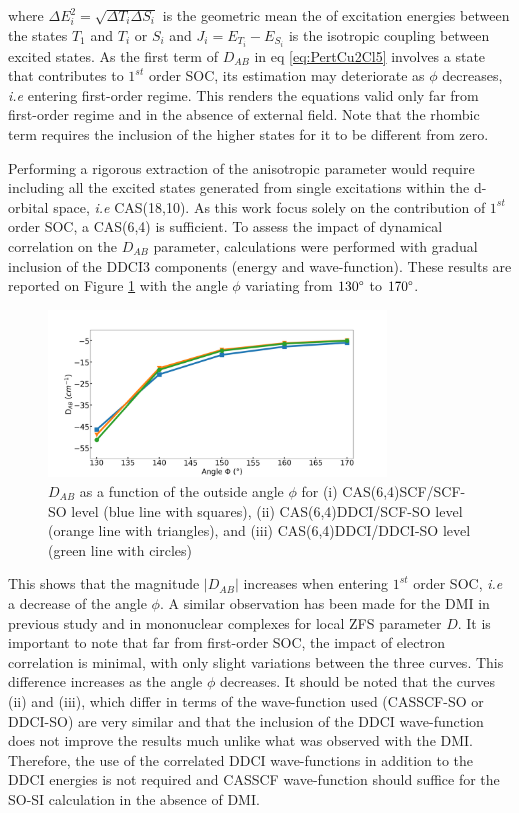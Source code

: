 \documentclass[10pt]{report}
\numberwithin{equation}{section}
\begin{document}
where $\Delta E^2_i=\sqrt{\Delta T_i \Delta S_i}$ is the geometric mean the of excitation energies between the states $T_1$ and $T_i$ or $S_i$ and $J_i=E_{T_i}-E_{S_i}$ is the isotropic coupling between excited states.
As the first term of $D_{AB}$ in eq \ref{eq:PertCu2Cl5} involves a state that contributes to $1^{st}$ order SOC, its estimation may deteriorate as $\phi$ decreases, \textit{i.e} entering first-order regime.
This renders the equations valid only far from first-order regime and in the absence of external field. Note that the rhombic term requires the inclusion of the higher states for it to be different from zero.

Performing a rigorous extraction of the anisotropic parameter would require including all the excited states generated from single excitations within the d-orbital space, \textit{i.e} CAS(18,10).
As this work focus solely on the contribution of $1^{st}$ order SOC, a CAS(6,4) is sufficient. 
To assess the impact of dynamical correlation on the $D_{AB}$ parameter, calculations were performed with gradual inclusion of the DDCI3 components (energy and wave-function).
These results are reported on Figure \ref{DABangle} with the angle $\phi$ variating from $130\degree$ to $170\degree$.

\begin{figure}[!ht]
    \centering
    \includegraphics[width=0.8\textwidth]{Images/D_AB_Angle2.png}
    \caption{$D_{AB}$ as a function of the outside angle $\phi$ for (i) CAS(6,4)SCF/SCF-SO level (blue line with squares), (ii) CAS(6,4)DDCI/SCF-SO level (orange line with triangles), and (iii) CAS(6,4)DDCI/DDCI-SO level (green line with circles) }
    \label{DABangle}
\end{figure}

This shows that the magnitude $|D_{AB}|$ increases when entering $1^{st}$ order SOC, \textit{i.e} a decrease of the angle $\phi$.
A similar observation has been made for the DMI in previous study and in mononuclear complexes for local ZFS parameter $D$.
It is important to note that far from first-order SOC, the impact of electron correlation is minimal, with only slight variations between the three curves.
This difference increases as the angle $\phi$ decreases.
It should be noted that the curves (ii) and (iii), which differ in terms of the wave-function used (CASSCF-SO or DDCI-SO) are very similar and that the inclusion of the DDCI wave-function does not improve the results much unlike what was observed with the DMI.
Therefore, the use of the correlated DDCI wave-functions in addition to the DDCI energies is not required and CASSCF wave-function should suffice for the SO-SI calculation in the absence of DMI. 
\end{document}
